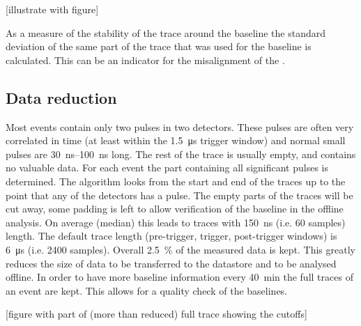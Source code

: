 [illustrate with figure]

As a measure of the stability of the trace around the baseline the standard deviation of the same part of the trace that was used for the baseline is calculated. This can be an indicator for the misalignment of the \adcs.



\subsection{Data reduction}

Most events contain only two pulses in two detectors. These pulses are often very correlated in time (at least within the \SI{1.5}{\micro\second} trigger window) and normal small pulses are \SIrange{30}{100}{\ns} long. The rest of the trace is usually empty, and contains no valuable data. For each event the part containing all significant pulses is determined. The algorithm looks from the start and end of the traces up to the point that any of the detectors has a pulse. The empty parts of the traces will be cut away, some padding is left to allow verification of the baseline in the offline analysis. On average (median) this leads to traces with \SI{150}{\ns} (i.e. 60 samples) length. The default trace length (pre-trigger, trigger, post-trigger windows) is \SI{6}{\micro\second} (i.e. 2400 samples). Overall \SI{2.5}{\percent} of the measured data is kept. This greatly reduces the size of data to be transferred to the datastore and to be analysed offline. In order to have more baseline information every \SI{40}{\minute} the full traces of an event are kept. This allows for a quality check of the baselines.

[figure with part of (more than reduced) full trace showing the cutoffs]




